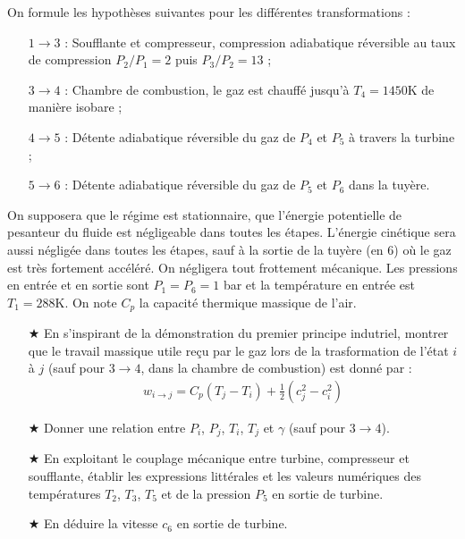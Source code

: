 \documentclass{report}
\begin{document}
On formule les hypothèses suivantes pour les différentes transformations :
\begin{itemize}

	\item[$1\rightarrow3$ :] Soufflante et compresseur, compression adiabatique réversible au taux de compression $P_2/P_1=2$ puis $P_3/P_2=13$ ;
	\item[$3\rightarrow4$ :] Chambre de combustion, le gaz est chauffé jusqu'à $T_4=1450$K de manière isobare ;
	\item[$4\rightarrow5$ :] Détente adiabatique réversible du gaz de $P_4$ et $P_5$ à travers la turbine ;
	\item[$5\rightarrow6$ :] Détente adiabatique réversible du gaz de $P_5$ et $P_6$ dans la tuyère.

\end{itemize}

On supposera que le régime est stationnaire, que l'énergie potentielle de pesanteur du fluide est négligeable dans toutes les étapes. L'énergie cinétique sera aussi négligée dans toutes les étapes, sauf à la sortie de la tuyère (en 6) où le gaz est très fortement accéléré. On négligera tout frottement mécanique. Les pressions en entrée et en sortie sont $P_1=P_6=1$ bar et la température en entrée est $T_1=288$K. On note $C_p$ la capacité thermique massique de l'air.

\begin{itemize}

	\item[$\bigstar$] En s'inspirant de la démonstration du premier principe indutriel, montrer que le travail massique utile reçu par le gaz lors de la trasformation de l'état $i$ à $j$ (sauf pour $3\rightarrow4$, dans la chambre de combustion) est donné par :
	\begin{align*}
		w_{i\rightarrow j}=C_p(T_j-T_i) + \frac{1}{2}\left(c_j^2-c_i^2 \right) 
	\end{align*}
	
	\item[$\bigstar$] Donner une relation entre $P_i$, $P_j$, $T_i$, $T_j$ et $\gamma$ (sauf pour $3\rightarrow4$).
	\item[$\bigstar$] En exploitant le couplage mécanique entre turbine, compresseur et soufflante, établir les expressions littérales et les valeurs numériques des températures $T_2$, $T_3$, $T_5$ et de la pression $P_5$ en sortie de turbine.
	\item[$\bigstar$] En déduire la vitesse $c_6$ en sortie de turbine. 

\end{itemize}
\end{document}
